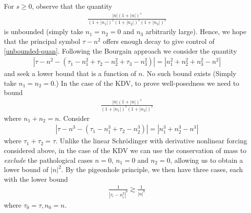 \documentclass[12pt,reqno]{amsart}
\numberwithin{equation}{section}  %
\numberwithin{figure}{section}
\theoremstyle{plain}
\theoremstyle{definition}
\theoremstyle{remark}
\begin{document}
%
%
For $s \ge 0$, observe that the quantity 
%
%
\begin{equation}
	\label{unbounded-quan}
	\begin{split}
		\frac{| n | \left (1 + |n| \right ) ^s}{\left (1 + |n_1| \right ) ^s \left (1 + |n_2| \right ) ^s \left (1 + |n_3| \right ) ^s} 
	\end{split}
\end{equation}
is unbounded (simply take $n_1 = n_2 = 0$ and $n_3$ arbitrarily large). Hence,
we hope that the principal symbol $\tau - n^2$ offers enough
decay to give control of \eqref{unbounded-quan}. Following the Bourgain
approach we consider the quantity
%
%
\begin{equation*}
	\begin{split}
		| \tau - n^2 - \left( \tau_{1} - n_{1}^2 + \tau_{2} - n_{2}^2 +
		\tau_{3} - n_{3}^2 \right) | = |n_{1}^2 + n_2^2 + n_3^2 - n^2|
	\end{split}
\end{equation*}
%
%
and seek a lower bound that is a function of $n$. No such bound exists (Simply
take $n_1 = n_2 =0$.) In the case of the KDV, to prove well-posedness we need to bound
\begin{equation}
	\label{KDV-bound-term}
	\begin{split}
		\frac{| n | \left (1 + |n| \right ) ^s}{\left (1 + |n_1| \right ) ^s \left (1 + |n_2| \right ) ^s} 
	\end{split}
\end{equation}
where $n_1 + n_2 = n$. 
Consider 
%
%
\begin{equation*}
	\begin{split}
		| \tau - n^{3} - \left( \tau_{1} - n_{1}^3 + \tau_{2} - n_{2}^3 \right) | = |n_{1}^3 + n_2^3 - n^3|
	\end{split}
\end{equation*}
where  $\tau_1 + \tau_2 = \tau$. Unlike the linear Schr{\"o}dinger with
derivative nonlinear forcing considered above, in the case of the KDV we can use the conservation of mass to
\emph{exclude} the pathological cases $n=0$, $n_1=0$ and $n_2=0$, allowing us to obtain
a lower bound of $|n|^{2}$. By the pigeonhole principle, we then have three
cases, each with the lower bound
%
%
\begin{equation*}
	\begin{split}
		\frac{1}{| \tau_{i} - n_{i}^2 |^{b}} \gtrsim \frac{1}{|n|^{b}}	
	\end{split}
\end{equation*}
%
%
where $\tau_0 =\tau, n_0 = n$. 
\end{document}
